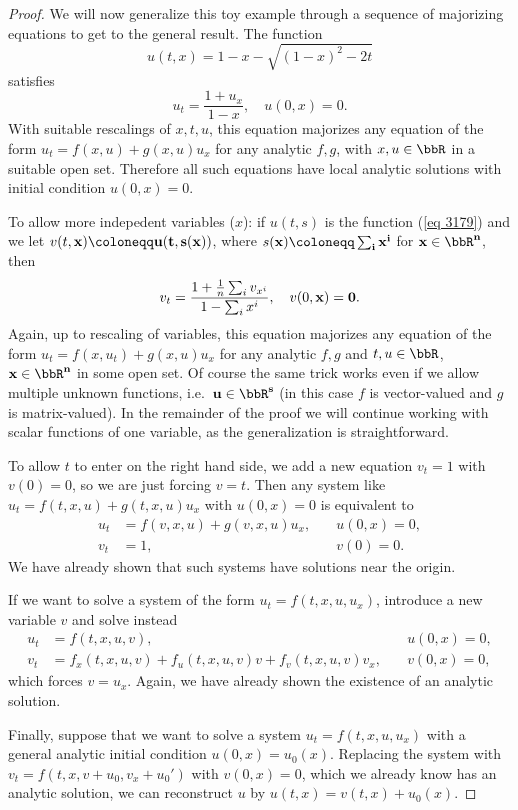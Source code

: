 \begin{proof}
    We will now generalize this toy example through a sequence of majorizing equations to get to the general result. The function 
    \[u(t,x)=1-x-\sqrt{(1-x)^2-2t}\label{eq 3179}\]
    satisfies 
    \[u_t=\frac{1+u_x}{1-x},\quad u(0,x)=0.\]
    With suitable rescalings of $x,t,u$, this equation majorizes any equation of the form $u_t=f(x,u)+g(x,u)u_x$ for any analytic $f,g$, with $x,u\in\bbR$ in a suitable open set. Therefore all such equations have local analytic solutions with initial condition $u(0,x)=0$.

    To allow more indepedent variables ($x$): if $u(t,s)$ is the function (\ref{eq 3179}) and we let $v(t,\bf{x})\coloneqq u(t,s(\bf{x}))$, where $s(\bf{x})\coloneqq \sum_i x^i$ for $\bf{x}\in\bbR^n$, then 
    \[v_t=\frac{1+\frac{1}{n}\sum_i v_{x^i}}{1-\sum_i x^i},\quad v(0,\bf{x})=0.\]
    Again, up to rescaling of variables, this equation majorizes any equation of the form $u_t=f(x,u_t)+g(x,u)u_x$ for any analytic $f,g$ and $t,u\in\bbR$, $\bf{x}\in\bbR^n$ in some open set. Of course the same trick works even if we allow multiple unknown functions, i.e.\ $\bf{u}\in\bbR^s$ (in this case $f$ is vector-valued and $g$ is matrix-valued). In the remainder of the proof we will continue working with scalar functions of one variable, as the generalization is straightforward.

    To allow $t$ to enter on the right hand side, we add a new equation $v_t=1$ with $v(0)=0$, so we are just forcing $v=t$. Then any system like $u_t=f(t,x,u)+g(t,x,u)u_x$ with $u(0,x)=0$ is equivalent to 
    \begin{align}
        u_t&=f(v,x,u)+g(v,x,u)u_x,\quad &u(0,x)=0,\\
        v_t&=1,\quad &v(0)=0.
    \end{align}
    We have already shown that such systems have solutions near the origin.

    If we want to solve a system of the form $u_t=f(t,x,u,u_x)$, introduce a new variable $v$ and solve instead 
    \begin{align}
        u_t&=f(t,x,u,v),\quad &u(0,x)=0,\\
        v_t&=f_x(t,x,u,v)+f_u(t,x,u,v)v+f_v(t,x,u,v)v_x,\quad &v(0,x)=0,
    \end{align}
    which forces $v=u_x$. Again, we have already shown the existence of an analytic solution.

    Finally, suppose that we want to solve a system $u_t=f(t,x,u,u_x)$ with a general analytic initial condition $u(0,x)=u_0(x)$. Replacing the system with $v_t=f(t,x,v+u_0,v_x+u_0')$ with $v(0,x)=0$, which we already know has an analytic solution, we can reconstruct $u$ by $u(t,x)=v(t,x)+u_0(x)$.
\end{proof}

